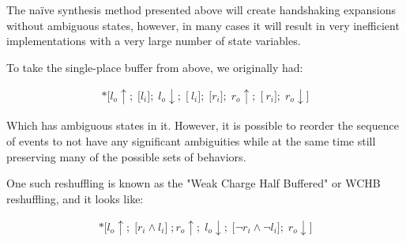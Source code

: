 \documentclass[times,10pt]{article}
\begin{document}
The na\"{i}ve synthesis method presented above will create handshaking expansions without ambiguous states, however, in many cases it will result in very inefficient implementations with a very large number of state variables. 

To take the single-place buffer from above, we originally had:

\begin{align*} 
*\textbf{[}l_o \! \uparrow; \; \textbf{[}l_i\textbf{]}; \; l_o\!\downarrow; \; \textbf{[}~l_i\textbf{]}; \; \textbf{[}r_i\textbf{]}; \; r_o \! \uparrow; \; \textbf{[}~r_i\textbf{]}; \; r_o \! \downarrow\textbf{]}
\end{align*}

Which has ambiguous states in it. However, it is possible to reorder the sequence of events to not have any significant ambiguities while at the same time still preserving many of the possible sets of behaviors.

One such reshuffling is known as the "Weak Charge Half Buffered" or WCHB reshuffling, and it looks like:


\begin{align*}
*\textbf{[}l_o \! \uparrow; \; \textbf{[}  r_i \wedge l_i  \textbf{]} \;; r_o\!\uparrow;  \;l_o \! \downarrow; \; \textbf{[}  \lnot r_i \wedge \lnot l_i  \textbf{]};  \; r_o\!\downarrow  \textbf{]} 
\end{align*} 







\end{document}
